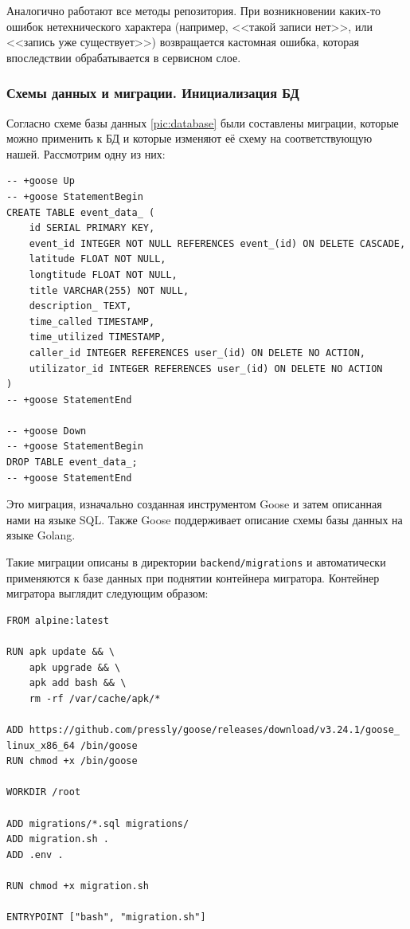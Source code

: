 \documentclass[diploma]{SCWorks}
\begin{document}
Аналогично работают все методы репозитория. При возникновении каких-то 
ошибок нетехнического характера (например, <<такой записи нет>>, или <<запись 
уже существует>>) возвращается кастомная ошибка, которая впоследствии 
обрабатывается в сервисном слое.

\subsubsection{Схемы данных и миграции. Инициализация БД}

Согласно схеме базы данных \ref{pic:database} были составлены миграции, 
которые можно применить к БД и которые изменяют её схему на соответствующую
нашей. Рассмотрим одну из них:

\begin{verbatim}
-- +goose Up
-- +goose StatementBegin
CREATE TABLE event_data_ (
    id SERIAL PRIMARY KEY,
    event_id INTEGER NOT NULL REFERENCES event_(id) ON DELETE CASCADE,
    latitude FLOAT NOT NULL,
    longtitude FLOAT NOT NULL,
    title VARCHAR(255) NOT NULL,
    description_ TEXT,
    time_called TIMESTAMP,
    time_utilized TIMESTAMP,
    caller_id INTEGER REFERENCES user_(id) ON DELETE NO ACTION,
    utilizator_id INTEGER REFERENCES user_(id) ON DELETE NO ACTION
)
-- +goose StatementEnd

-- +goose Down
-- +goose StatementBegin
DROP TABLE event_data_;
-- +goose StatementEnd
\end{verbatim}

Это миграция, изначально созданная инструментом Goose и затем описанная 
нами на языке SQL. Также Goose поддерживает описание схемы базы данных на 
языке Golang.

Такие миграции описаны в директории \texttt{backend/migrations} и автоматически
применяются к базе данных при поднятии контейнера мигратора.
Контейнер мигратора выглядит следующим образом:
\begin{verbatim}
FROM alpine:latest

RUN apk update && \
    apk upgrade && \
    apk add bash && \
    rm -rf /var/cache/apk/*

ADD https://github.com/pressly/goose/releases/download/v3.24.1/goose_
linux_x86_64 /bin/goose
RUN chmod +x /bin/goose

WORKDIR /root

ADD migrations/*.sql migrations/
ADD migration.sh .
ADD .env .

RUN chmod +x migration.sh

ENTRYPOINT ["bash", "migration.sh"]
\end{verbatim}
\end{document}
